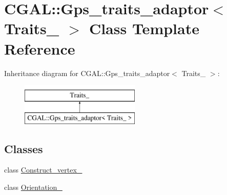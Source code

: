 \hypertarget{class_c_g_a_l_1_1_gps__traits__adaptor}{}\section{C\+G\+AL\+::Gps\+\_\+traits\+\_\+adaptor$<$ Traits\+\_\+ $>$ Class Template Reference}
\label{class_c_g_a_l_1_1_gps__traits__adaptor}
Inheritance diagram for C\+G\+AL\+::Gps\+\_\+traits\+\_\+adaptor$<$ Traits\+\_\+ $>$\+:\begin{figure}[H]
\begin{center}
\leavevmode
\includegraphics[height=2.000000cm]{class_c_g_a_l_1_1_gps__traits__adaptor}
\end{center}
\end{figure}
\subsection*{Classes}
\begin{DoxyCompactItemize}
\item 
class \mbox{\hyperlink{class_c_g_a_l_1_1_gps__traits__adaptor_1_1_construct__vertex__2}{Construct\+\_\+vertex\+\_}}
\item 
class \mbox{\hyperlink{class_c_g_a_l_1_1_gps__traits__adaptor_1_1_orientation__2}{Orientation\+\_}}
\end{DoxyCompactItemize}
